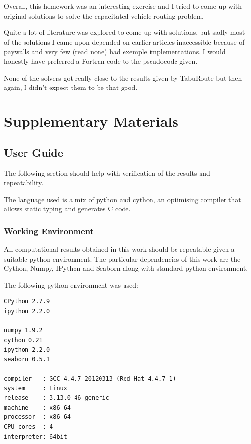 \documentclass{article} %
\begin{document}
Overall, this homework was an interesting exercise and I tried to come up with original solutions to solve the capacitated vehicle routing problem.\newline

Quite a lot of literature was explored to come up with solutions, but sadly most of the solutions I came upon depended on earlier articles inaccessible because of paywalls and very few (read none) had exemple implementations. I would honestly have preferred a Fortran code to the pseudocode given.\newline

None of the solvers got really close to the results given by TabuRoute \citep{taburoute} but then again, I didn't expect them to be that good.\newline







\newpage
\section{Supplementary Materials}

\subsection{User Guide}
\label{user_guide}

The following section should help with verification of the results and repeatability.\newline

The language used is a mix of python and cython, an optimising compiler that allows static typing and generates C code.


\subsubsection{Working Environment}
All computational results obtained in this work should be repeatable given a suitable python environment. The particular dependencies of this work are the Cython, Numpy, IPython and Seaborn along with standard python environment.\newline

The following python environment was used:

\begin{verbatim}
CPython 2.7.9
ipython 2.2.0

numpy 1.9.2
cython 0.21
ipython 2.2.0
seaborn 0.5.1

compiler   : GCC 4.4.7 20120313 (Red Hat 4.4.7-1)
system     : Linux
release    : 3.13.0-46-generic
machine    : x86_64
processor  : x86_64
CPU cores  : 4
interpreter: 64bit

\end{verbatim}
\end{document}
